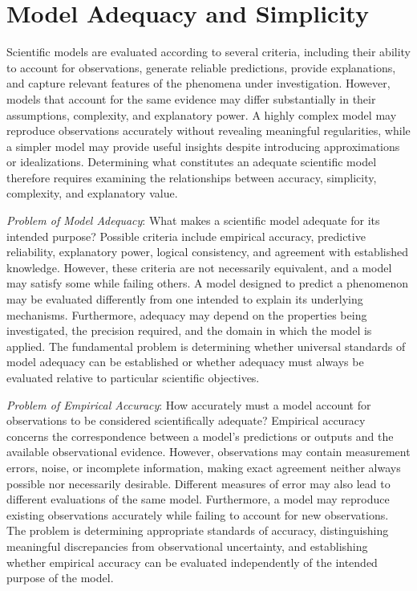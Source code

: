 \section{Model Adequacy and Simplicity}
\label{sec:model_adequacy}

Scientific models are evaluated according to several criteria, including their ability to account for observations, generate reliable predictions, provide explanations, and capture relevant features of the phenomena under investigation. However, models that account for the same evidence may differ substantially in their assumptions, complexity, and explanatory power. A highly complex model may reproduce observations accurately without revealing meaningful regularities, while a simpler model may provide useful insights despite introducing approximations or idealizations. Determining what constitutes an adequate scientific model therefore requires examining the relationships between accuracy, simplicity, complexity, and explanatory value.

\emph{Problem of Model Adequacy}: What makes a scientific model adequate for its intended purpose? Possible criteria include empirical accuracy, predictive reliability, explanatory power, logical consistency, and agreement with established knowledge. However, these criteria are not necessarily equivalent, and a model may satisfy some while failing others. A model designed to predict a phenomenon may be evaluated differently from one intended to explain its underlying mechanisms. Furthermore, adequacy may depend on the properties being investigated, the precision required, and the domain in which the model is applied. The fundamental problem is determining whether universal standards of model adequacy can be established or whether adequacy must always be evaluated relative to particular scientific objectives.

\emph{Problem of Empirical Accuracy}: How accurately must a model account for observations to be considered scientifically adequate? Empirical accuracy concerns the correspondence between a model's predictions or outputs and the available observational evidence. However, observations may contain measurement errors, noise, or incomplete information, making exact agreement neither always possible nor necessarily desirable. Different measures of error may also lead to different evaluations of the same model. Furthermore, a model may reproduce existing observations accurately while failing to account for new observations. The problem is determining appropriate standards of accuracy, distinguishing meaningful discrepancies from observational uncertainty, and establishing whether empirical accuracy can be evaluated independently of the intended purpose of the model.

